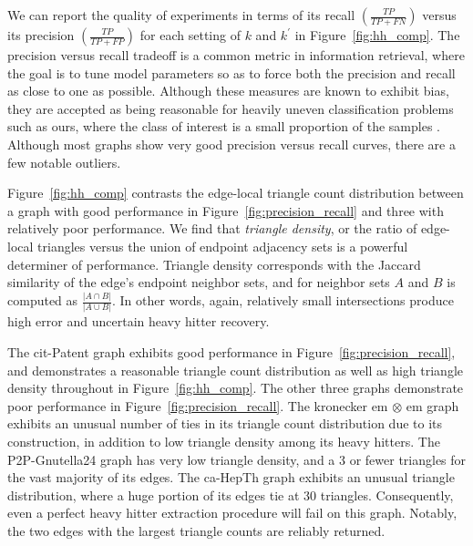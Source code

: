 \documentclass{vldb}
\begin{document}
We can report the quality of experiments in terms of its recall $\left ( \frac{TP}{TP + FN} \right )$ versus its precision $\left ( \frac{TP}{TP + FP} \right )$ for each setting of $k$ and $k^\prime$ in Figure~\ref{fig:hh_comp}.
The precision versus recall tradeoff is a common metric in information retrieval, where the goal is to tune model parameters so as to force both the precision and recall as close to one as possible.
Although these measures are known to exhibit bias, they are accepted as being reasonable for heavily uneven classification problems such as ours, where the class of interest is a small proportion of the samples \cite{boughorbel2017optimal}. 
Although most graphs show very good precision versus recall curves, there are a few notable outliers. 






Figure~\ref{fig:hh_comp} contrasts the edge-local triangle count distribution between a graph with good performance in Figure~\ref{fig:precision_recall} and three with relatively poor performance.
We find that \emph{triangle density}, or the ratio of edge-local triangles versus the union of endpoint adjacency sets is a powerful determiner of performance.
Triangle density corresponds with the Jaccard similarity of the edge's endpoint neighbor sets, and for neighbor sets $A$ and $B$ is computed as $\frac{|A \cap B|}{|A \cup B|}$.
In other words, again, relatively small intersections produce high error and uncertain heavy hitter recovery. 

The cit-Patent graph exhibits good performance in Figure~\ref{fig:precision_recall}, and demonstrates a reasonable triangle count distribution as well as high triangle density throughout in Figure~\ref{fig:hh_comp}.
The other three graphs demonstrate poor performance in Figure~\ref{fig:precision_recall}.
The kronecker em $\otimes$ em graph exhibits an unusual number of ties in its triangle count distribution due to its construction, in addition to low triangle density among its heavy hitters.
The P2P-Gnutella24 graph has very low triangle density, and a 3 or fewer triangles for the vast majority of its edges.
The ca-HepTh graph exhibits an unusual triangle distribution, where a huge portion of its edges tie at 30 triangles.
Consequently, even a perfect heavy hitter extraction procedure will fail on this graph.
Notably, the two edges with the largest triangle counts are reliably returned.
\end{document}
